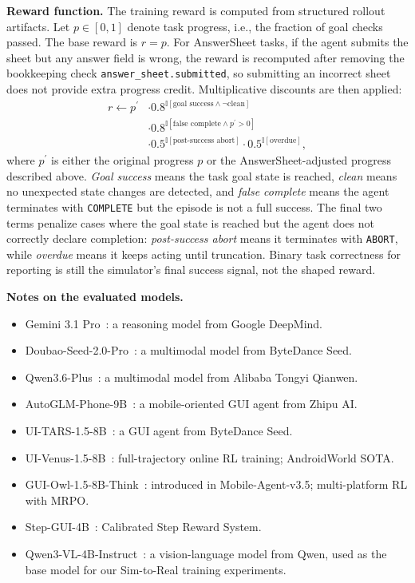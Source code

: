 \textbf{Reward function.} The training reward is computed from structured rollout artifacts. Let $p \in [0,1]$ denote task progress, i.e., the fraction of goal checks passed. The base reward is $r=p$. For AnswerSheet tasks, if the agent submits the sheet but any answer field is wrong, the reward is recomputed after removing the bookkeeping check \texttt{answer\_sheet.submitted}, so submitting an incorrect sheet does not provide extra progress credit. Multiplicative discounts are then applied:
\begin{equation*}
\begin{aligned}
r \leftarrow p^\prime
  &\cdot 0.8^{\mathbb{I}[\text{goal success} \wedge \neg \text{clean}]} \\
  &\cdot 0.8^{\mathbb{I}[\text{false complete} \wedge p^\prime>0]} \\
  &\cdot 0.5^{\mathbb{I}[\text{post-success abort}]}
   \cdot 0.5^{\mathbb{I}[\text{overdue}]},
\end{aligned}
\end{equation*}
where $p^\prime$ is either the original progress $p$ or the AnswerSheet-adjusted progress described above. \textit{Goal success} means the task goal state is reached, \textit{clean} means no unexpected state changes are detected, and \textit{false complete} means the agent terminates with \texttt{COMPLETE} but the episode is not a full success. The final two terms penalize cases where the goal state is reached but the agent does not correctly declare completion: \textit{post-success abort} means it terminates with \texttt{ABORT}, while \textit{overdue} means it keeps acting until truncation. Binary task correctness for reporting is still the simulator's final success signal, not the shaped reward.

\textbf{Notes on the evaluated models.}
\begin{itemize}
  \item Gemini 3.1 Pro~\cite{Gemini31Pro}: a reasoning model from Google DeepMind.
  \item Doubao-Seed-2.0-Pro~\cite{DoubaoSeed20Pro}: a multimodal model from ByteDance Seed.
  \item Qwen3.6-Plus~\cite{Qwen36Plus}: a multimodal model from Alibaba Tongyi Qianwen.
  \item AutoGLM-Phone-9B~\cite{AutoGLM}: a mobile-oriented GUI agent from Zhipu AI.
  \item UI-TARS-1.5-8B~\cite{UITARS}: a GUI agent from ByteDance Seed.
  \item UI-Venus-1.5-8B~\cite{UIVenus15}: full-trajectory online RL training; AndroidWorld SOTA.
  \item GUI-Owl-1.5-8B-Think~\cite{GUIOw15}: introduced in Mobile-Agent-v3.5; multi-platform RL with MRPO.
  \item Step-GUI-4B~\cite{StepGUI}: Calibrated Step Reward System.
  \item Qwen3-VL-4B-Instruct~\cite{Qwen3VL}: a vision-language model from Qwen, used as the base model for our Sim-to-Real training experiments.
\end{itemize}


